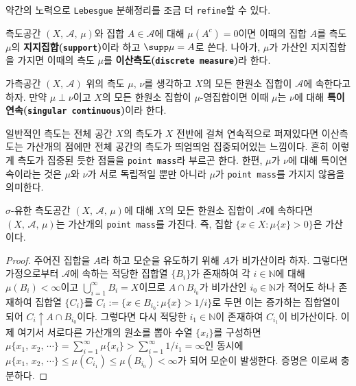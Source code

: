 약간의 노력으로 \texttt{Lebesgue} 분해정리를 조금 더 \texttt{refine}할 수 있다.

\begin{definition}
    측도공간 $(X,\,\mathcal{A},\,\mu)$와 집합 $A\in\mathcal{A}$에 대해 $\mu(A^c)=0$이면 이때의 집합 $A$를 측도 $\mu$의 \textbf{지지집합(\texttt{support})}이라 하고 $\supp\mu=A$로 쓴다. 나아가, $\mu$가 가산인 지지집합을 가지면 이때의 측도 $\mu$를 \textbf{이산측도(\texttt{discrete measure})}라 한다.
\end{definition}

\begin{definition}
    가측공간 $(X,\,\mathcal{A})$ 위의 측도 $\mu,\,\nu$를 생각하고 $X$의 모든 한원소 집합이 $\mathcal{A}$에 속한다고 하자. 만약 $\mu\perp\nu$이고 $X$의 모든 한원소 집합이 $\mu$-영집합이면 이때 $\mu$는 $\nu$에 대해 \textbf{특이연속(\texttt{singular continuous})}이라 한다.
\end{definition}

일반적인 측도는 전체 공간 $X$의 측도가 $X$ 전반에 걸쳐 연속적으로 퍼져있다면 이산측도는 가산개의 점에만 전체 공간의 측도가 띄엄띄엄 집중되어있는 느낌이다. 흔히 이렇게 측도가 집중된 듯한 점들을 \texttt{point mass}라 부르곤 한다. 한편, $\mu$가 $\nu$에 대해 특이연속이라는 것은 $\mu$와 $\nu$가 서로 독립적일 뿐만 아니라 $\mu$가 \texttt{point mass}를 가지지 않음을 의미한다.

\begin{lemma}
    $\sigma$-유한 측도공간 $(X,\,\mathcal{A},\,\mu)$에 대해 $X$의 모든 한원소 집합이 $\mathcal{A}$에 속하다면 $(X,\,\mathcal{A},\,\mu)$는 가산개의 \texttt{point mass}를 가진다. 즉, 집합 $\{x\in X:\mu\{x\}>0\}$은 가산이다.
\end{lemma}

\begin{proof}
    주어진 집합을 $A$라 하고 모순을 유도하기 위해 $A$가 비가산이라 하자. 그렇다면 가정으로부터 $\mathcal{A}$에 속하는 적당한 집합열 $\{B_i\}$가 존재하여 각 $i\in\mathbb{N}$에 대해 $\mu(B_i)<\infty$이고 $\bigcup_{i=1}^\infty B_i=X$이므로 $A\cap B_{i_0}$가 비가산인 $i_0\in\mathbb{N}$가 적어도 하나 존재하여 집합열 $\{C_i\}$를 $C_i:=\{x\in B_{i_0}:\mu\{x\}>1/i\}$로 두면 이는 증가하는 집합열이 되어 $C_i\uparrow A\cap B_{i_0}$이다. 그렇다면 다시 적당한 $i_1\in\mathbb{N}$이 존재하여 $C_{i_1}$이 비가산이다. 이제 여기서 서로다른 가산개의 원소를 뽑아 수열 $\{x_i\}$를 구성하면 $\mu\{x_1,\,x_2,\,\cdots\}=\sum_{i=1}^\infty\mu\{x_i\}>\sum_{i=1}^\infty1/i_1=\infty$인 동시에 $\mu\{x_1,\,x_2,\,\cdots\}\leq\mu(C_{i_1})\leq\mu(B_{i_0})<\infty$가 되어 모순이 발생한다. 증명은 이로써 충분하다.
\end{proof}

